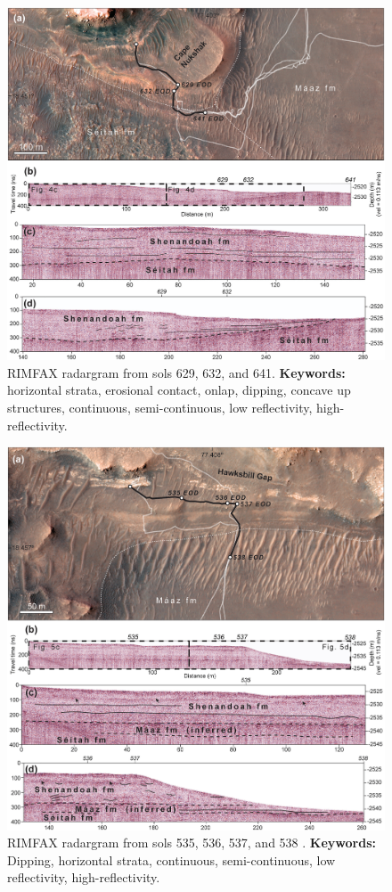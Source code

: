 \begin{figure}[h!]
    \centering
    \includegraphics[width=0.9\linewidth]{Figures/0.5RIMFAX/Stack_2024-04.jpg}
    \caption[RIMFAX radargram from sols 629, 632, and 641.]{RIMFAX radargram from sols 629, 632, and 641. \textbf{Keywords:} horizontal strata, erosional contact, onlap, dipping, concave up structures, continuous, semi-continuous, low reflectivity, high-reflectivity.}
    \label{fig:Stack24-4}
\end{figure}

\begin{figure}[h!]
    \centering
    \includegraphics[width=0.9\linewidth]{Figures/0.5RIMFAX/Stack_2024-05.jpg}
    \caption[RIMFAX radargram from sols 535, 536, 537, and 538.]{RIMFAX radargram from sols 535, 536, 537, and 538  \citep{Stack2024}. \textbf{Keywords:} Dipping, horizontal strata, continuous, semi-continuous, low reflectivity, high-reflectivity.}
    \label{fig:Stack24-5}
\end{figure}